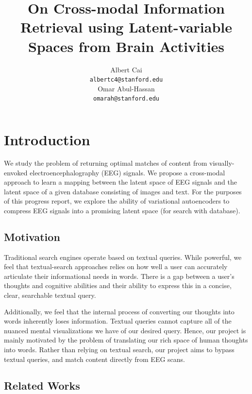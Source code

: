 \documentclass{article}
\title{On Cross-modal Information Retrieval using Latent-variable Spaces from Brain Activities}
\author{%
  Albert Cai \\
  \texttt{albertc4@stanford.edu} \\
  \And
  Omar Abul-Hassan \\
  \texttt{omarah@stanford.edu} \\
}
\begin{document}
\maketitle



\section{Introduction}
We study the problem of returning optimal matches of content from visually-envoked electroencephalography (EEG) signals. We propose a cross-modal approach to learn a mapping between the latent space of EEG signals and the latent space of a given database consisting of images and text. For the purposes of this progress report, we explore the ability of variational autoencoders to compress EEG signals into a promising latent space (for search with database).

\subsection{Motivation}

Traditional search engines operate based on textual queries. While powerful, we feel that textual-search approaches relies on how well a user can accurately articulate their informational needs in words. There is a gap between a user's thoughts and cognitive abilities and their ability to express this in a concise, clear, searchable textual query.

Additionally, we feel that the internal process of converting our thoughts into words inherently loses information. Textual queries cannot capture all of the nuanced mental visualizations we have of our desired query. Hence, our project is mainly motivated by the problem of translating our rich space of human thoughts into words. Rather than relying on textual search, our project aims to bypass textual queries, and match content directly from EEG scans.

\subsection{Related Works}
\end{document}
